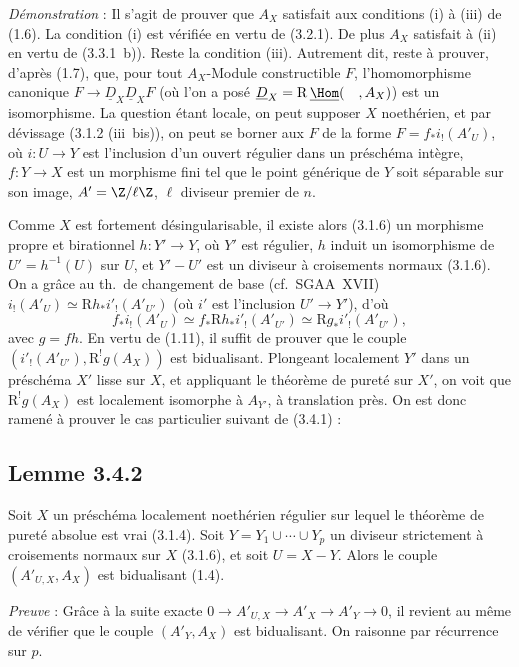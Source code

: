 \emph{Démonstration} : Il s'agit de prouver que $A_X$ satisfait aux conditions (i) à (iii) de (1.6). La condition (i) est vérifiée en vertu de (3.2.1). De plus $A_X$ satisfait à (ii) en vertu de (3.3.1~b)). Reste la condition (iii). Autrement dit, reste à prouver, d'après (1.7), que, pour tout $A_X$-Module constructible $F$, l'homomorphisme canonique $F \to \underline{D}_X \underline{D}_X F$ (où l'on a posé $\underline{D}_X = \mathrm{R}\,\underline{\Hom}(\quad, A_X)$) est un isomorphisme. La question étant locale, on peut supposer $X$ noethérien, et par dévissage (3.1.2 (iii~bis)), on peut se borner aux $F$ de la forme $F = f_{*}i_{!}(A'_U)$, où $i : U \to Y$ est l'inclusion d'un ouvert régulier dans un préschéma intègre, $f : Y \to X$ est un morphisme fini tel que le point générique de $Y$ soit séparable sur son image, $A' = \Z/\ell\Z$, $\ell$ diviseur premier de $n$.

Comme $X$ est fortement désingularisable, il existe alors (3.1.6) un morphisme propre et birationnel $h : Y' \to Y$, où $Y'$ est régulier, $h$ induit un isomorphisme de $U' = h^{-1}(U)$ sur $U$, et $Y' - U'$ est un diviseur à croisements normaux (3.1.6). On a grâce au th.~de changement de base (cf.~SGAA~XVII) $i_{!}(A'_U) \simeq \mathrm{R} h_{*} i'_{!}(A'_{U'})$ (où $i'$ est l'inclusion $U' \to Y'$), d'où
\[
f_{*} i_{!}(A'_U) \simeq f_{*} \mathrm{R} h_{*} i'_{!}(A'_{U'}) \simeq \mathrm{R} g_{*} i'_{!}(A'_{U'}),
\]
avec $g = fh$. En vertu de (1.11), il suffit de prouver que le couple 
$(i'_{!}(A'_{U'}), \mathrm{R}^{!}g(A_X))$ est
bidualisant. Plongeant localement $Y'$ dans un préschéma $X'$ lisse sur $X$, et appliquant le théorème de pureté sur $X'$, on voit que $\mathrm{R}^{!}g(A_X)$ est localement isomorphe à $A_{Y'}$, à translation près. On est donc ramené à prouver le cas particulier suivant de (3.4.1) :

\subsection*{Lemme 3.4.2}
Soit $X$ un préschéma localement noethérien régulier sur lequel le théorème de pureté absolue est vrai (3.1.4). Soit $Y = Y_1 \cup \cdots \cup Y_p$ un diviseur strictement à croisements normaux sur $X$ (3.1.6), et soit $U = X - Y$. Alors le couple $(A'_{U,X}, A_X)$ est bidualisant (1.4).

\emph{Preuve} : Grâce à la suite exacte $0 \to A'_{U,X} \to A'_X \to A'_Y \to 0$, il revient au même de vérifier que le couple $(A'_Y, A_X)$ est bidualisant. On raisonne par récurrence sur $p$.

